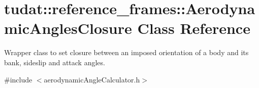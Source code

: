 \hypertarget{classtudat_1_1reference__frames_1_1AerodynamicAnglesClosure}{}\section{tudat\+:\+:reference\+\_\+frames\+:\+:Aerodynamic\+Angles\+Closure Class Reference}
\label{classtudat_1_1reference__frames_1_1AerodynamicAnglesClosure}


Wrapper class to set closure between an imposed orientation of a body and its bank, sideslip and attack angles.  




{\ttfamily \#include $<$aerodynamic\+Angle\+Calculator.\+h$>$}

